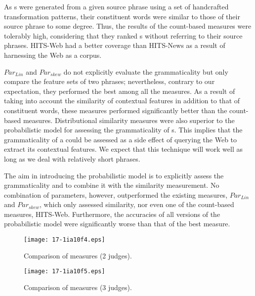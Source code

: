 \documentclass[english]{jnlp_1.4}
\begin{document}
As {\pc}s were generated from a given source phrase using a set of
handcrafted transformation patterns, their constituent words were
similar to those of their source phrase to some degree.  Thus, the
results of the count-based measures were tolerably high, considering
that they ranked {\pc}s without referring to their source phrases.
HITS-Web had a better coverage than HITS-News as a result of
harnessing the Web as a corpus.

$\mathit{Par_{Lin}}$ and $\mathit{Par_{skew}}$ do not explicitly
evaluate the grammaticality but only compare the feature sets of two
phrases; nevertheless, contrary to our expectation, they performed the
best among all the measures.
As a result of taking into account the similarity of contextual
features in addition to that of constituent words, these measures
performed significantly better than the count-based measures.
Distributional similarity measures were also superior to the
probabilistic model for assessing the grammaticality of {\pc}s.  This
implies that the grammaticality of a {\pc} could be assessed as a side
effect of querying the Web to extract its contextual features.  We
expect that this technique will work well as long as we deal with
relatively short phrases.

The aim in introducing the probabilistic model is to explicitly assess
the grammaticality and to combine it with the similarity measurement.
No combination of parameters, however, outperformed the existing
measures, $\mathit{Par_{Lin}}$ and $\mathit{Par_{skew}}$, which only
assessed similarity, nor even one of the count-based measures,
HITS-Web.
Furthermore, the accuracies of all versions of the probabilistic model
were significantly worse than that of the best measure.

\begin{figure}[t]
\begin{minipage}[t]{204pt}
\begin{center}
\texttt{[image: 17-1ia10f4.eps]}
\end{center}
\caption{Comparison of measures (2 judges).}
\label{fig:har.2ok}
\end{minipage}
\hfill
\begin{minipage}[t]{203pt}
\begin{center}
\texttt{[image: 17-1ia10f5.eps]}
\end{center}
\caption{Comparison of measures (3 judges).}
\label{fig:har.3ok}
\end{minipage}
\end{figure}
\end{document}
